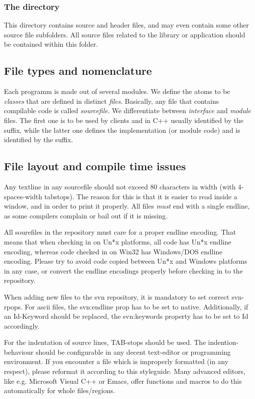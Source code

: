 \subsubsection{The  directory}
This directory contains source and header files, and may even contain some other source file subfolders.
All source files related to the library or application should be contained within this folder.


\subsection{File types and nomenclature}
Each programm is made out of several modules.
We define the atoms to be \emph{classes} that are defined in distinct \emph{files}.
Basically, any file that contains compilable code is called \emph{sourcefile}.
We differentiate between \emph{interface} and \emph{module} files.
The first one is to be used by clients and in C++ usually identified by the  suffix,  while the latter one defines the implementation (or module code) and is identified by the  suffix.

\subsection{File layout and compile time issues}

Any textline in any sourcefile should not exceed 80 characters in width (with 4-spaces-width tabstops).
The reason for this is that it is easier to read inside a window, and in order to print it properly.
All files \emph{must} end with a single endline, as some compilers complain or bail out if it is missing.

All sourefiles in the repository must care for a proper endline encoding.
That means that when checking in on Un*x platforms, all code has Un*x endline encoding, whereas code checked in on Win32 has Windows/DOS endline encoding.
Please try to avoid code copied between Un*x and Windows platforms in any case, or convert the endline encodings properly before checking in to the repository.

When adding new files to the svn repository, it is mandatory to set correct svn-rpops. For ascii files, the svn:endline prop has to be set to native.
Additionally, if an Id-Keyword should be replaced, the svn:keywords property has to be set to Id accordingly.

For the indentation of source lines, TAB-stops should be used.
The indention-behaviour should be configurable in any decent text-editor or programming environment.
If you encounter a file which is improperly formatted (in any respect), please reformat it according to this styleguide.
Many advanced editors, like e.g. Microsoft Visual C++ or Emacs, offer functions and macros to do this automatically for whole files/regions.

